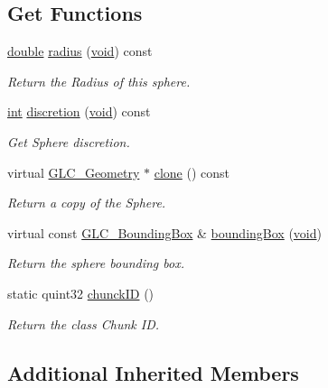\subsection*{Get Functions}
\begin{DoxyCompactItemize}
\item 
\hyperlink{_super_l_u_support_8h_a8956b2b9f49bf918deed98379d159ca7}{double} \hyperlink{class_g_l_c___sphere_a69b0f8d96a6b0c80503fdc7bb15db472}{radius} (\hyperlink{group___u_a_v_objects_plugin_ga444cf2ff3f0ecbe028adce838d373f5c}{void}) const 
\begin{DoxyCompactList}\small\item\em Return the Radius of this sphere. \end{DoxyCompactList}\item 
\hyperlink{ioapi_8h_a787fa3cf048117ba7123753c1e74fcd6}{int} \hyperlink{class_g_l_c___sphere_a7895624948528548d894a2495fee52d5}{discretion} (\hyperlink{group___u_a_v_objects_plugin_ga444cf2ff3f0ecbe028adce838d373f5c}{void}) const 
\begin{DoxyCompactList}\small\item\em Get Sphere discretion. \end{DoxyCompactList}\item 
virtual \hyperlink{class_g_l_c___geometry}{G\-L\-C\-\_\-\-Geometry} $\ast$ \hyperlink{class_g_l_c___sphere_a4573612fb5a58098414e8fe52c9513ff}{clone} () const 
\begin{DoxyCompactList}\small\item\em Return a copy of the Sphere. \end{DoxyCompactList}\item 
virtual const \hyperlink{class_g_l_c___bounding_box}{G\-L\-C\-\_\-\-Bounding\-Box} \& \hyperlink{class_g_l_c___sphere_ad04c353a79231b016a6c148dae97ae77}{bounding\-Box} (\hyperlink{group___u_a_v_objects_plugin_ga444cf2ff3f0ecbe028adce838d373f5c}{void})
\begin{DoxyCompactList}\small\item\em Return the sphere bounding box. \end{DoxyCompactList}\item 
static quint32 \hyperlink{class_g_l_c___sphere_a85b43603407ededd4954c1b901a34cee}{chunck\-I\-D} ()
\begin{DoxyCompactList}\small\item\em Return the class Chunk I\-D. \end{DoxyCompactList}\end{DoxyCompactItemize}
\subsection*{Additional Inherited Members}


